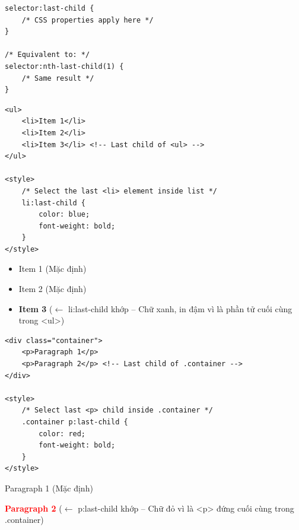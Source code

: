 \documentclass[11pt,oneside]{book}
\begin{document}
\begin{codeWindow}
\begin{lstlisting}[language=CSS3]
selector:last-child {
    /* CSS properties apply here */
}

/* Equivalent to: */
selector:nth-last-child(1) {
    /* Same result */
}
\end{lstlisting}
\end{codeWindow}

\begin{codeWindow}
\begin{lstlisting}[language=HTML5]
<ul>
    <li>Item 1</li>
    <li>Item 2</li>
    <li>Item 3</li> <!-- Last child of <ul> -->
</ul>

<style>
    /* Select the last <li> element inside list */
    li:last-child {
        color: blue;
        font-weight: bold;
    }
</style>
\end{lstlisting}
\end{codeWindow}

\begin{browserWindow}
\sffamily\small
\begin{itemize}[leftmargin=1.5em, itemsep=2pt, parsep=0pt]
    \item Item 1 {\scriptsize\textcolor{gray!60}{(Mặc định)}}
    \item Item 2 {\scriptsize\textcolor{gray!60}{(Mặc định)}}
    \item \textcolor{primaryBlue}{\textbf{Item 3}} {\scriptsize\textcolor{gray!60}{($\leftarrow$ li:last-child khớp -- Chữ xanh, in đậm vì là phần tử cuối cùng trong <ul>)}}
\end{itemize}
\end{browserWindow}

\begin{codeWindow}
\begin{lstlisting}[language=HTML5]
<div class="container">
    <p>Paragraph 1</p>
    <p>Paragraph 2</p> <!-- Last child of .container -->
</div>

<style>
    /* Select last <p> child inside .container */
    .container p:last-child {
        color: red;
        font-weight: bold;
    }
</style>
\end{lstlisting}
\end{codeWindow}

\begin{browserWindow}
\sffamily\small
Paragraph 1 {\scriptsize\textcolor{gray!60}{(Mặc định)}} \par\vspace{2pt}
\textcolor{red}{\textbf{Paragraph 2}} {\scriptsize\textcolor{gray!60}{($\leftarrow$ p:last-child khớp -- Chữ đỏ vì là <p> đứng cuối cùng trong .container)}}
\end{browserWindow}
\end{document}
